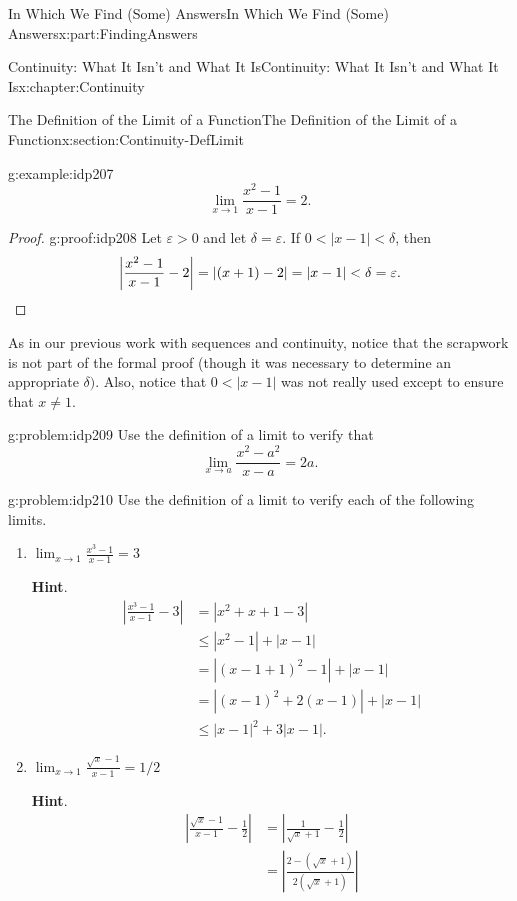 \documentclass[oneside,10pt,]{book}
\newcommand{\blocktitlefont}{\relax}
\numberwithin{equation}{section}
\newcommand{\qedhere}{\relax}
\newcommand{\abs}[1]{\left|#1\right|}
\def\limit#1#2#3{{\displaystyle\lim_{#1\rightarrow #2}#3}}
\newcommand{\eps}{\varepsilon}
\newcommand{\lt}{<}
\newcommand{\amp}{&}
\begin{document}
\begin{partptx}{In Which We Find (Some) Answers}{}{In Which We Find (Some) Answers}{}{}{x:part:FindingAnswers}
\begin{chapterptx}{Continuity: What It Isn't and What It Is}{}{Continuity: What It Isn't and What It Is}{}{}{x:chapter:Continuity}
\begin{sectionptx}{The Definition of the Limit of a Function}{}{The Definition of the Limit of a Function}{}{}{x:section:Continuity-DefLimit}
\begin{example}{}{g:example:idp207}
\begin{equation*}
\limit{x}{1}{\frac{x^2-1}{x-1}}=2\text{.}
\end{equation*}
%
\end{example}
\begin{proof}{}{g:proof:idp208}
Let \(\eps>0\) and let \(\delta=\eps\). If \(0\lt \abs{x-1}\lt \delta\), then%
\begin{equation*}
\abs{\frac{x^2-1}{x-1}-2}=\abs{(x+1)-2}=\abs{x-1}\lt \delta=\eps\text{.}\qedhere
\end{equation*}
%
\end{proof}
As in our previous work with sequences and continuity, notice that the scrapwork is not part of the formal proof (though it was necessary to determine an appropriate \(\delta)\).  Also, notice that \(0\lt \abs{x-1}\) was not really used except to ensure that \(x\neq 1\).%
\begin{problem}{}{g:problem:idp209}%
Use the definition of a limit to verify that%
\begin{equation*}
\limit{x}{a}{\frac{x^2-a^2}{x-a}}=2a.{}
\end{equation*}
%
\end{problem}
\begin{problem}{}{g:problem:idp210}%
Use the definition of a limit to verify each of the following limits.%
\begin{enumerate}[font=\bfseries,label=(\alph*),ref=\alph*]
\item{}\(\limit{x}{1}{\frac{x^3-1}{x-1}}=3\)%
\par\smallskip%
\noindent\textbf{\blocktitlefont Hint}.\hypertarget{g:hint:idp211}{}\quad{}%
\begin{align*}
\abs{\frac{x^3-1}{x-1}-3} \amp = \abs{x^2+x+1-3}\\
\amp \leq\abs{x^2-1}+\abs{x-1}\\
\amp =\abs{(x-1+1)^2-1}+\abs{x-1}\\
\amp =\abs{(x-1)^2+2(x-1)}+\abs{x-1}\\
\amp \leq\abs{x-1}^2 + 3\abs{x-1}\text{.}
\end{align*}
%
\item{}\(\limit{x}{1}{\frac{\sqrt{x}-1}{x-1}}=1/2\)%
\par\smallskip%
\noindent\textbf{\blocktitlefont Hint}.\hypertarget{g:hint:idp212}{}\quad{}%
\begin{align*}
\abs{\frac{\sqrt{x}-1}{x-1}-\frac12}\amp = \abs{\frac{1}{\sqrt{x}+1}-\frac12}\\
\amp =\abs{\frac{2-\left(\sqrt{x}+1\right)}{2\left(\sqrt{x}+1\right)}}\\

\end{align*}
\end{enumerate}
\end{problem}
\end{sectionptx}
\end{chapterptx}
\end{partptx}
\end{document}
